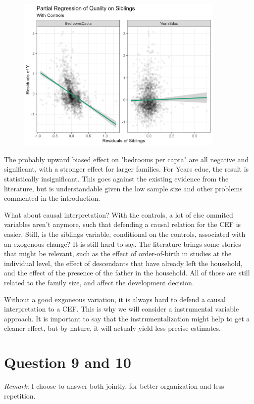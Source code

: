 \documentclass[12pt]{article}
\begin{document}
\begin{figure}[!htbp]
    \centering
    \includegraphics[width=0.9\textwidth]{figures/quality_controls.png}
    \label{fig:quality_controls}
\end{figure}

The probably upward biased effect on "bedrooms per capta" are all negative and significant, with a stronger effect for larger families. For Years educ, the result is statistically insignificant. This goes against the existing evidence from the literature, but is understandable given the low sample size and other problems commented in the introduction.

What about causal interpretation? With the controls, a lot of else ommited variables aren't anymore, such that defending a causal relation for the CEF is easier. Still, is the siblings variable, conditional on the controls, associated with an exogenous change? It is still hard to say. The literature brings some stories that might be relevant, such as the effect of order-of-birth in studies at the individual level, the effect of descendants that have already left the household, and the effect of the presence of the father in the household. All of those are still related to the family size, and affect the development decision.

Without a good exgoneous variation, it is always hard to defend a causal interpretation to a CEF. This is why we will consider a instrumental variable approach. It is important to say that the instrumentalization might help to get a cleaner effect, but by nature, it will actualy yield less precise estimates.


\section*{Question 9 and 10}
\textit{Remark}: I choose to answer both jointly, for better organization and less repetition.
\end{document}
